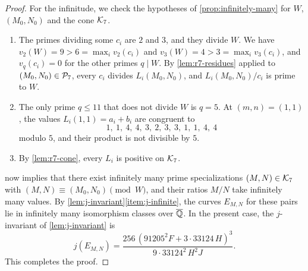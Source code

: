 \begin{proof}
For the infinitude, we check the hypotheses of
\cref{prop:infinitely-many} for $W$, $(M_0,N_0)$ and the cone $\mathcal K_7$.
\begin{enumerate}[label=(\alph*)]
\item[\ref{item:inf-progression}] The primes dividing some $c_i$ are $2$ and $3$, and they divide $W$.
We have $v_2(W)=9>6=\max_iv_2(c_i)$ and $v_3(W)=4>3=\max_iv_3(c_i)$, and
$v_q(c_i)=0$ for the other primes $q\mid W$. By \cref{lem:r7-residues}
applied to $(M_0,N_0)\in\mathcal P_7$, every $c_i$ divides $L_i(M_0,N_0)$, and
$L_i(M_0,N_0)/c_i$ is prime to $W$.
\item[\ref{item:inf-small-primes}] The only prime $q\le11$ that does not divide $W$ is $q=5$. At
$(m,n)=(1,1)$, the values $L_i(1,1)=a_i+b_i$ are congruent to
\[
 1,\ 1,\ 4,\ 4,\ 3,\ 2,\ 3,\ 3,\ 1,\ 1,\ 4,\ 4
\]
modulo $5$, and their product is not divisible by $5$.
\item[\ref{item:inf-cone}] By \cref{lem:r7-cone}, every $L_i$ is positive on $\mathcal K_7$.
\end{enumerate}
 now implies that there exist infinitely many prime
specializations $(M,N)\in\mathcal K_7$ with $(M,N)\equiv(M_0,N_0)\pmod W$, and
their ratios $M/N$ take infinitely many values. By
\cref{lem:j-invariant}\ref{item:j-infinite}, the curves $E_{M,N}$ for these
pairs lie in infinitely many isomorphism classes over $\overline{\mathbb Q}$. In the
present case, the $j$-invariant of \cref{lem:j-invariant} is
\[
 j(E_{M,N})=\frac{256\,(91205^2F+3\cdot33124\,H)^3}{9\cdot33124^2\,H^2J}.
\]
This completes the proof.
\end{proof}
